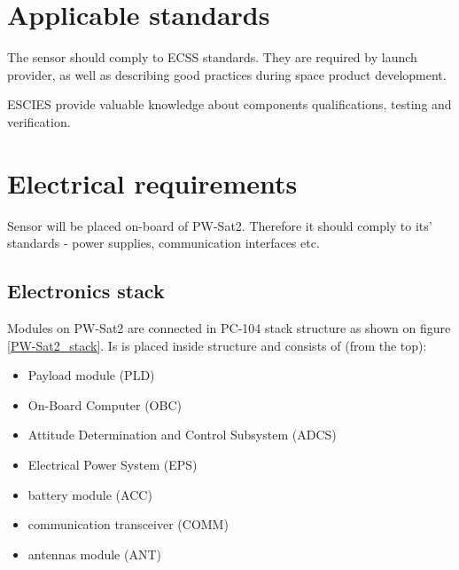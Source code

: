 \section{Applicable standards}
    The sensor should comply to ECSS \cite{ECSS_URL} standards. They are required by launch provider, as well as describing good practices during space product development.

    ESCIES \cite{ESCIES_URL} provide valuable knowledge about components qualifications, testing and verification.

\section{Electrical requirements}
    Sensor will be placed on-board of PW-Sat2. Therefore it should comply to its' standards - power supplies, communication interfaces etc.

    \subsection{Electronics stack}
        Modules on PW-Sat2 are connected in PC-104 stack structure as shown on figure \ref{PW-Sat2_stack}. Is is placed inside structure and consists of (from the top):
        \begin{itemize}
            \item Payload module (PLD)
            \item On-Board Computer (OBC)
            \item Attitude Determination and Control Subsystem (ADCS)
            \item Electrical Power System (EPS)
            \item battery module (ACC)
            \item communication transceiver (COMM)
            \item antennas module (ANT)
        \end{itemize}


